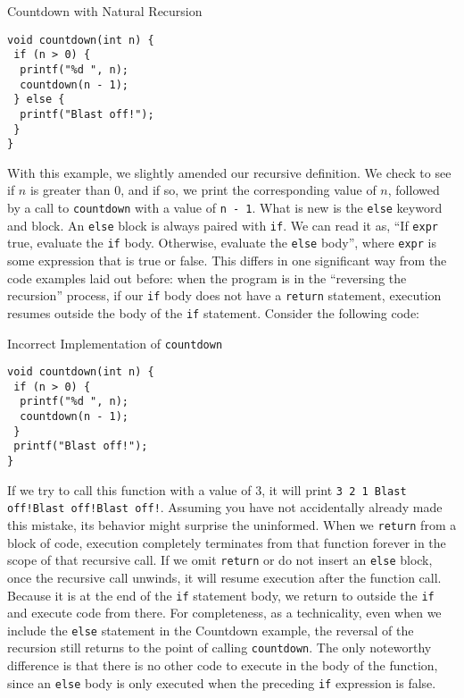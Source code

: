 \begin{cl}[main.c]{Countdown with Natural Recursion}
\begin{lstlisting}[language=MyC]
void countdown(int n) {
 if (n > 0) {
  printf("%d ", n);
  countdown(n - 1);
 } else {
  printf("Blast off!");
 }    
}
\end{lstlisting}
\end{cl}

With this example, we slightly amended our recursive definition. We check to see if $n$ is greater than $0$, and if so, we print the corresponding value of $n$, followed by a call to \texttt{countdown} with a value of \texttt{n - 1}. What is new is the \texttt{else} keyword and block. An \texttt{else} block is always paired with \texttt{if}. We can read it as, ``If \texttt{expr} true, evaluate the \texttt{if} body. Otherwise, evaluate the \texttt{else} body'', where \texttt{expr} is some expression that is true or false. This differs in one significant way from the code examples laid out before: when the program is in the ``reversing the recursion'' process, if our \texttt{if} body does not have a \texttt{return} statement, execution resumes outside the body of the \texttt{if} statement. Consider the following code:

\begin{cl}[main.c]{Incorrect Implementation of \texttt{countdown}}
\begin{lstlisting}[language=MyC]
void countdown(int n) {
 if (n > 0) {
  printf("%d ", n);
  countdown(n - 1);
 }
 printf("Blast off!");
}
\end{lstlisting}
\end{cl}

If we try to call this function with a value of $3$, it will print \texttt{3 2 1 Blast off!Blast off!Blast off!}. Assuming you have not accidentally already made this mistake, its behavior might surprise the uninformed. When we \texttt{return} from a block of code, execution completely terminates from that function forever in the scope of that recursive call. If we omit \texttt{return} or do not insert an \texttt{else} block, once the recursive call unwinds, it will resume execution after the function call. Because it is at the end of the \texttt{if} statement body, we return to outside the \texttt{if} and execute code from there. For completeness, as a technicality, even when we include the \texttt{else} statement in the \textsf{Countdown} example, the reversal of the recursion still returns to the point of calling \texttt{countdown}. The only noteworthy difference is that there is no other code to execute in the body of the function, since an \texttt{else} body is only executed when the preceding \texttt{if} expression is false.

